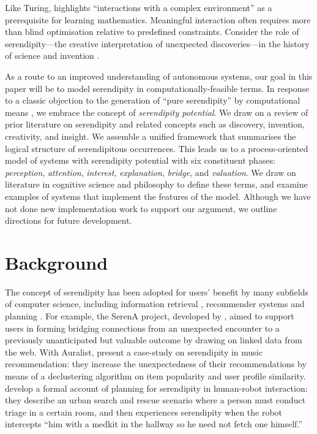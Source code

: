 Like Turing, \citet[p.~2015]{sloman2008well} highlights ``interactions with a complex environment'' as a prerequisite for learning mathematics.  Meaningful interaction often requires more than blind optimisation relative to predefined constraints.  Consider the role of serendipity---the creative interpretation of unexpected discoveries---in the history of science and invention \cite{roberts,van1994anatomy}.

As a route to an improved understanding of autonomous systems, our goal in this paper will be to model serendipity in computationally-feasible terms. In response to a classic objection to the generation of ``pure serendipity'' by computational means \cite{van1994anatomy},  we embrace the concept of \emph{serendipity potential}.
We draw on a review of prior literature on serendipity and related concepts such as discovery, invention, creativity, and insight.  We assemble a unified framework that summarises the logical structure of serendipitous occurrences.
This leads us to a process-oriented model of systems with serendipity potential with six constituent phases:
\emph{perception}, \emph{attention}, \emph{interest}, \emph{explanation}, \emph{bridge}, and \emph{valuation}.
We draw on literature in cognitive science and philosophy to define these terms, and examine examples of systems that implement the features of the model.
Although we have not done new implementation work to support our argument, we outline directions for future development.

\section{Background} \label{sec:background}

The concept of serendipity has been adopted for users' benefit by many subfields of computer science, including information retrieval \cite{Toms2000, Andre:2009:XSP:1518701.1519009}, recommender systems \cite{kotkov2016survey} and planning \cite{muscettola1997board, chakraborti2015planning}. For example, the {\sf SerenA} project, developed by \citet{maxwell2012designing}, aimed to support users in forming bridging connections from an unexpected encounter to a previously unanticipated but valuable outcome by drawing on linked data from the web. With {\sf Auralist}, \citet{Zhang2011} present a case-study on serendipity in music recommendation: they increase the unexpectedness of their recommendations by means of a declustering algorithm on item popularity and user profile similarity. \citet{chakraborti2015planning} develop a formal account of planning for serendipity in human-robot interaction: they describe an urban search and rescue scenario where a person must conduct triage in a certain room, and then experiences serendipity when the robot intercepts ``him with a medkit in the hallway so he need not fetch one himself.''

